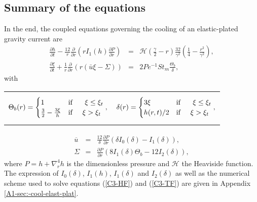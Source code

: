 \subsection{Summary of the equations}
\label{C3-sec:summary-equations}

In  the  end,  the  coupled  equations governing  the  cooling  of  an
elastic-plated gravity current are
\begin{eqnarray}
  \frac{\partial h}{\partial t}-\frac{12}{r}
  \frac{\partial}{\partial      r}
  \left( r I_1(h) \frac{\partial P}{\partial
  r}\right)
  \label{C3-HF}
  & =& \mathcal{H}(\frac{\gamma}{2}-r)\frac{32}{\gamma^{2}}\left(\frac{1}{4}-\frac{r^{2}}{\gamma^{2}}\right),\\
  \frac{\partial                                       \xi}{\partial
  t}+\frac{1}{r}\frac{\partial}{\partial                          r}
  \left( r\left(\bar{u}\xi-\Sigma\right)\right)&=&2Pe^{-1}St_m\frac{\Theta_b}{\delta},\label{C3-TF}
\end{eqnarray}
with

\begin{tabular}{p{6cm}p{6cm}}
{
\begin{equation}
    \Theta_b(r)=
    \begin{cases}
      1 &\text{if } \hspace{.5cm} \xi\leq \xi_t \nonumber\\
      \frac{3}{2}-\frac{3\xi}{h} & \text{if} \hspace{.5cm} \xi > \xi_t\nonumber
    \end{cases},
  \end{equation}
                                   }
&
{
  \begin{equation}
    \delta(r)=
    \begin{cases}
      3\xi &\text{if } \hspace{.5cm} \xi\leq \xi_t\\
      h(r,t)/2 & \text{if} \hspace{.5cm} \xi > \xi_t\nonumber\\
    \end{cases},
  \end{equation}
  }
\end{tabular}
\begin{eqnarray}
  \overline{u}&=& \frac{12}{\delta}\frac{\partial P}{\partial r}\left(\delta
                  I_0(\delta)-I_1(\delta)\right) \label{C3-ubarF},\\
  \Sigma     &=& \frac{\partial     P}{\partial
                 r}\left(8I_1(\delta)\Theta_b-12I_2(\delta)\right),\label{C3-SigmaF}
\end{eqnarray}
where  $P   =  h+\nabla_r^4h$   is  the  dimensionless   pressure  and
$\mathcal{H}$   the    Heaviside   function.    The    expression   of
$I_0(\delta)$, $I_1(h)$,  $I_1(\delta)$ and  $I_2(\delta)$ as  well as
the  numerical  scheme  used  to  solve  equations  (\ref{C3-HF})  and
(\ref{C3-TF}) are given in Appendix \ref{A1-sec:-cool-elast-plat}.

